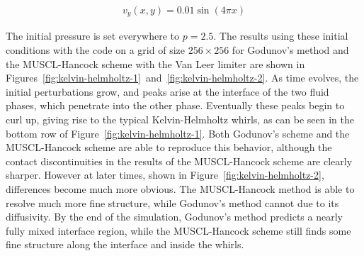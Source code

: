 \begin{align}
    v_y(x,y) = 0.01 \sin(4\pi x)
\end{align}

The initial pressure is set everywhere to $p = 2.5$. The results using these initial conditions
with the \meshhydro code on a grid of size $256 \times 256$ for Godunov's method and the
MUSCL-Hancock scheme with the Van Leer limiter are shown in
Figures~\ref{fig:kelvin-helmholtz-1}~and~\ref{fig:kelvin-helmholtz-2}. As time evolves, the initial
perturbations grow, and peaks arise at the interface of the two fluid phases, which penetrate into
the other phase. Eventually these peaks begin to curl up, giving rise to the typical
Kelvin-Helmholtz whirls, as can be seen in the bottom row of Figure~\ref{fig:kelvin-helmholtz-1}.
Both Godunov's scheme and the MUSCL-Hancock scheme are able to reproduce this behavior, although
the contact discontinuities in the results of the MUSCL-Hancock scheme are clearly sharper. However
at later times, shown in Figure~\ref{fig:kelvin-helmholtz-2}, differences become much more obvious.
The MUSCL-Hancock method is able to resolve much more fine structure, while Godunov's method cannot
due to its diffusivity. By the end of the simulation, Godunov's method predicts a nearly fully
mixed interface region, while the MUSCL-Hancock scheme still finds some fine structure along the
interface and inside the whirls.





